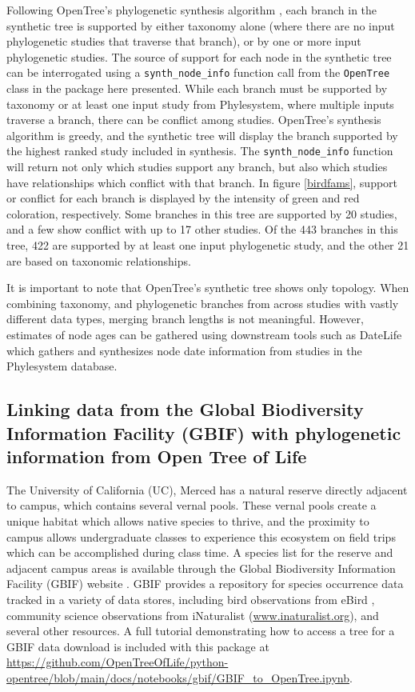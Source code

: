 \documentclass[oupdraft]{sysbio_sse}
\begin{document}
Following OpenTree's phylogenetic synthesis algorithm \citep{redelings_supertree_2017}, each branch in the synthetic tree is supported
by either taxonomy alone (where there are no input phylogenetic studies that traverse that branch), or by one or more input phylogenetic studies.
The source of support for each node in the synthetic tree can be interrogated using a \texttt{synth\_node\_info} function call from the \texttt{OpenTree} class in the package here presented.
While each branch must be supported by taxonomy or at least one input study from Phylesystem, where multiple inputs traverse a branch, there can be conflict among studies.
OpenTree's synthesis algorithm is greedy, and the synthetic tree will display the branch supported by the highest ranked study included in synthesis.
The \texttt{synth\_node\_info} function will return not only which studies support any branch, but also which studies have relationships which conflict with that branch.
In figure \ref{birdfams}, support or conflict for each branch is displayed by the intensity of green and red coloration, respectively. Some branches in this tree are supported by 20 studies, and a few show conflict with up to 17 other studies. Of the 443 branches in this tree, 422 are supported by at least one input phylogenetic study, and the other 21 are based on taxonomic relationships.

It is important to note that OpenTree's synthetic tree shows only topology. When combining taxonomy, and phylogenetic branches from across studies with vastly different data types, merging branch lengths is not meaningful. However, estimates of node ages can be gathered using downstream tools such as DateLife \citep{sanchez-reyes_datelife_2019} which gathers and synthesizes node date information from studies in the Phylesystem database.

\subsection{Linking data from the Global Biodiversity Information Facility (GBIF) with phylogenetic information from Open Tree of Life}

\bigskip

The University of California (UC), Merced has a natural reserve directly adjacent to campus, which contains several vernal pools. These vernal pools create a unique habitat which allows native species to thrive, and the proximity to campus allows undergraduate classes to experience this ecosystem on field trips which can be accomplished during class time.
A species list for the reserve and adjacent campus areas is available through the Global Biodiversity Information Facility (GBIF) website \citep{gbif_secretariat_gbif_2019}. GBIF provides a repository for species occurrence data tracked in a variety of data stores, including bird observations from eBird \citep{sullivan_ebird_2009}, community science observations from iNaturalist (\url{www.inaturalist.org}), and several other resources. A full tutorial demonstrating how to access a tree for a GBIF data download is included with this package at \url{https://github.com/OpenTreeOfLife/python-opentree/blob/main/docs/notebooks/gbif/GBIF_to_OpenTree.ipynb}.
\end{document}
